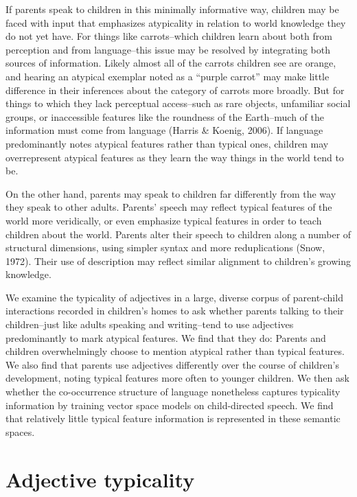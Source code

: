 \documentclass[10pt, letterpaper]{article}
\begin{document}
If parents speak to children in this minimally informative way, children
may be faced with input that emphasizes atypicality in relation to world
knowledge they do not yet have. For things like carrots--which children
learn about both from perception and from language--this issue may be
resolved by integrating both sources of information. Likely almost all
of the carrots children see are orange, and hearing an atypical exemplar
noted as a ``purple carrot'' may make little difference in their
inferences about the category of carrots more broadly. But for things to
which they lack perceptual access--such as rare objects, unfamiliar
social groups, or inaccessible features like the roundness of the
Earth--much of the information must come from language (Harris \&
Koenig, 2006). If language predominantly notes atypical features rather
than typical ones, children may overrepresent atypical features as they
learn the way things in the world tend to be.

On the other hand, parents may speak to children far differently from
the way they speak to other adults. Parents' speech may reflect typical
features of the world more veridically, or even emphasize typical
features in order to teach children about the world. Parents alter their
speech to children along a number of structural dimensions, using
simpler syntax and more reduplications (Snow, 1972). Their use of
description may reflect similar alignment to children's growing
knowledge.

We examine the typicality of adjectives in a large, diverse corpus of
parent-child interactions recorded in children's homes to ask whether
parents talking to their children--just like adults speaking and
writing--tend to use adjectives predominantly to mark atypical features.
We find that they do: Parents and children overwhelmingly choose to
mention atypical rather than typical features. We also find that parents
use adjectives differently over the course of children's development,
noting typical features more often to younger children. We then ask
whether the co-occurrence structure of language nonetheless captures
typicality information by training vector space models on child-directed
speech. We find that relatively little typical feature information is
represented in these semantic spaces.

\hypertarget{adjective-typicality}{%
\section{Adjective typicality}\label{adjective-typicality}}
\end{document}
